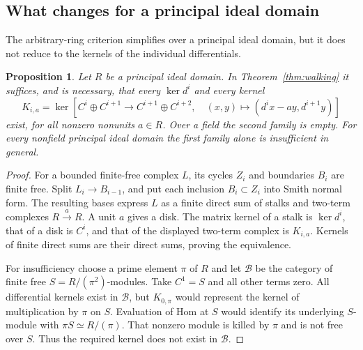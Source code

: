 \documentclass[11pt,a4paper]{article}
\newtheorem{proposition}[theorem]{Proposition}
\theoremstyle{definition}
\begin{document}
\subsection{What changes for a principal ideal domain}
The arbitrary-ring criterion simplifies over a principal ideal domain,
but it does not reduce to the kernels of the individual differentials.
\begin{proposition}\label{prop:pid}
Let $R$ be a principal ideal domain. In Theorem~\ref{thm:walking} it
suffices, and is necessary, that every $\ker d^i$ and every kernel
\[
 K_{i,a}=\ker\left[C^i\oplus C^{i+1}\longrightarrow
 C^{i+1}\oplus C^{i+2},\quad
 (x,y)\longmapsto(d^ix-ay,d^{i+1}y)\right]
\]
exist, for all nonzero nonunits $a\in R$. Over a field the second
family is empty. For every nonfield principal ideal domain the
first family alone is insufficient in general.
\end{proposition}
\begin{proof}
For a bounded finite-free complex $L$, its cycles $Z_i$ and boundaries
$B_i$ are finite free. Split $L_i\to B_{i-1}$, and put each inclusion
$B_i\subset Z_i$ into Smith normal form. The resulting bases express
$L$ as a finite direct sum of stalks and two-term complexes
$R\xrightarrow{a}R$. A unit $a$ gives a disk. The matrix kernel of
a stalk is $\ker d^i$, that of a disk is $C^i$, and that of the
displayed two-term complex is $K_{i,a}$. Kernels of finite direct
sums are their direct sums, proving the equivalence.

For insufficiency choose a prime element $\pi$ of $R$ and let
$\mathcal B$ be the category of finite free $S=R/(\pi^2)$-modules.
Take $C^1=S$ and all other terms zero. All differential kernels
exist in $\mathcal B$, but $K_{0,\pi}$ would represent the kernel
of multiplication by $\pi$ on $S$. Evaluation of Hom at $S$ would
identify its underlying $S$-module with $\pi S\simeq R/(\pi)$.
That nonzero module is killed by $\pi$ and is not free over $S$.
Thus the required kernel does not exist in $\mathcal B$.
\end{proof}
\end{document}
